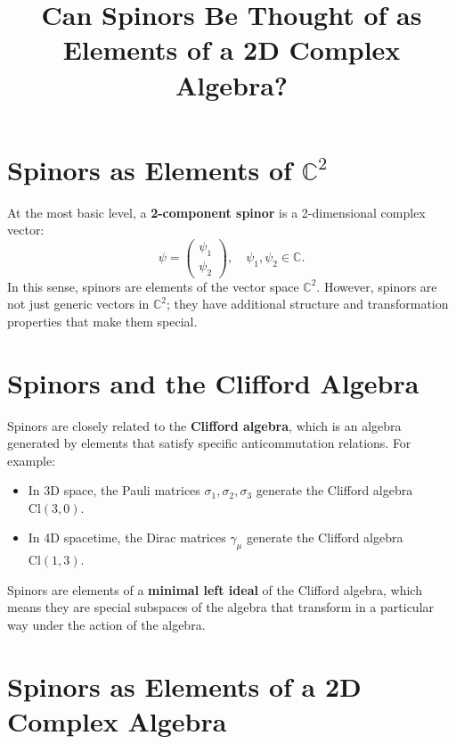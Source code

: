 \documentclass{article}
\begin{document}
\title{Can Spinors Be Thought of as Elements of a 2D Complex Algebra?}
\author{}
\date{}
\maketitle

\section*{Spinors as Elements of $\mathbb{C}^2$}

At the most basic level, a \textbf{2-component spinor} is a 2-dimensional
complex vector: 
\begin{equation*}
\psi = 
\begin{pmatrix}
\psi_1 \\ 
\psi_2%
\end{pmatrix}%
, \quad \psi_1, \psi_2 \in \mathbb{C}. 
\end{equation*}
In this sense, spinors are elements of the vector space $\mathbb{C}^2$.
However, spinors are not just generic vectors in $\mathbb{C}^2$; they have
additional structure and transformation properties that make them special.

\section*{Spinors and the Clifford Algebra}

Spinors are closely related to the \textbf{Clifford algebra}, which is an
algebra generated by elements that satisfy specific anticommutation
relations. For example:

\begin{itemize}
\item In 3D space, the Pauli matrices $\sigma_1, \sigma_2, \sigma_3$
generate the Clifford algebra $\text{Cl}(3, 0)$. 

\item In 4D spacetime, the Dirac matrices $\gamma_\mu$ generate the Clifford
algebra $\text{Cl}(1, 3)$.
\end{itemize}

Spinors are elements of a \textbf{minimal left ideal} of the Clifford
algebra, which means they are special subspaces of the algebra that
transform in a particular way under the action of the algebra.

\section*{Spinors as Elements of a 2D Complex Algebra}
\end{document}
